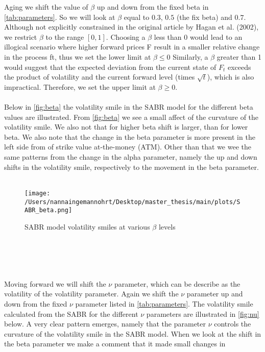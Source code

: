 Aging we shift the value of $\beta$ up and down from the fixed beta in \autoref{tab:parameters}. So we will look at $\beta$ equal to $0.3$,
$0.5$ (the fix beta) and $0.7$. 
Although not explicitly constrained in the original article by Hagan et al. (2002), we restrict $\beta$ to the range $[0, 1]$. 
Choosing a $\beta$ less than 0 would lead to an illogical scenario where higher forward prices F result in a smaller 
relative change in the process ft, thus we set the lower limit at $\beta \leq 0$ Similarly, a $\beta$ greater than 1 would 
suggest that the expected deviation from the current state of $F_t$ exceeds the product of volatility and the current 
forward level (times $\sqrt{t}$), which is also impractical. Therefore, we set the upper limit at $\beta \geq 0$.
\\\\
Below in \autoref{fig:beta} the volatility smile in the SABR model for the different beta values are illustrated.
From \autoref{fig:beta} we see a small affect of the curvature of the volatility smile. We also not that for higher 
beta shift is larger, than for lower beta. We also note that the change in the beta parameter is more present in 
the left side from of strike value at-the-money (ATM). Other than that we wee the same patterns from the change in 
the alpha parameter, namely the up and down shifts in the volatility smile, respectively to the movement in the 
beta parameter.
\\\\
\begin{figure}[htbp]
    \centering
    \texttt{[image: /Users/nannaingemannohrt/Desktop/master\_thesis/main/plots/SABR\_beta.png]}
    \caption{SABR model volatility smiles at various $\beta$ levels}
    \label{fig:beta}
\end{figure}
\\\\
\\\\
\noindent
Moving forward we will shift the $\nu$ parameter, which can be describe as the volatility of the volatility parameter.
Again we shift the $\nu$ parameter up and down from the fixed $\nu$ parameter listed in \autoref{tab:parameters}.
The volatility smile calculated from the SABR for the different $\nu$ parameters are illustrated in \autoref{fig:nu} below.
A very clear pattern emerges, namely that the parameter $\nu$ controls the curvature of the volatility smile in
the SABR model. When we look at the shift in the beta parameter we make a comment that it made small changes in 
